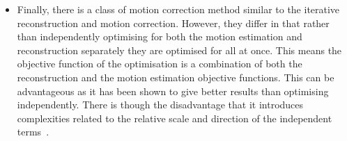 \begin{itemize}
                \item Finally, there is a class of motion correction method similar to the iterative reconstruction and motion correction. However, they differ in that rather than independently optimising for both the motion estimation and reconstruction separately they are optimised for all at once. This means the objective function of the optimisation is a combination of both the reconstruction and the motion estimation objective functions. This can be advantageous as it has been shown to give better results than optimising independently. There is though the disadvantage that it introduces complexities related to the relative scale and direction of the independent terms~\parencite{Kalantari2016RespiratorySMEIR}.
            \end{itemize}
    
        
        
            
            
                            
                            
                
                            
